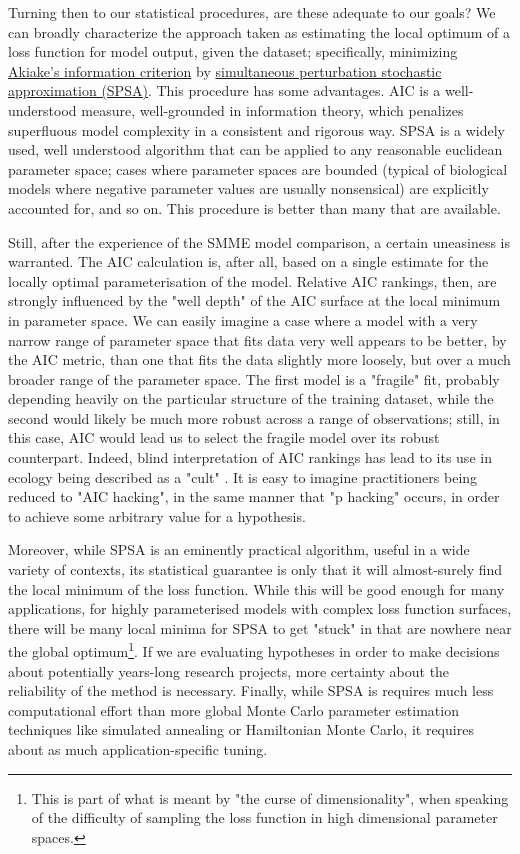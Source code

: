 Turning then to our statistical procedures, are these adequate to our goals? We can broadly characterize the approach taken as estimating the local optimum of a loss function for model output, given the dataset; specifically, minimizing \hyperref[AIC]{Akiake's information criterion} by \hyperref[SPSA]{simultaneous perturbation stochastic approximation (SPSA)}. This procedure has some advantages. AIC is a well-understood measure, well-grounded in information theory, which penalizes superfluous model complexity in a consistent and rigorous way. SPSA is a widely used, well understood algorithm that can be applied to any reasonable euclidean parameter space; cases where parameter spaces are bounded (typical of biological models where negative parameter values are usually nonsensical) are explicitly accounted for, and so on. This procedure is better than many that are available.

Still, after the experience of the SMME model comparison, a certain uneasiness is warranted. The AIC calculation is, after all, based on a single estimate for the locally optimal parameterisation of the model. Relative AIC rankings, then, are strongly influenced by the "well depth" of the AIC surface at the local minimum in parameter space. We can easily imagine a case where a model with a very narrow range of parameter space that fits data very well appears to be better, by the AIC metric, than one that fits the data slightly more loosely, but over a much broader range of the parameter space. The first model is a "fragile" fit, probably depending heavily on the particular structure of the training dataset, while the second would likely be much more robust across a range of observations; still, in this case, AIC would lead us to select the fragile model over its robust counterpart. Indeed, blind interpretation of AIC rankings has lead to its use in ecology being described as a "cult" \cite{Brewer2020}. It is easy to imagine practitioners being reduced to "AIC hacking", in the same manner that "p hacking" occurs, in order to achieve some arbitrary value for a hypothesis.

Moreover, while SPSA is an eminently practical algorithm, useful in a wide variety of contexts, its statistical guarantee is only that it will almost-surely find the local minimum of the loss function. While this will be good enough for many applications, for highly parameterised models with complex loss function surfaces, there will be many local minima for SPSA to get "stuck" in that are nowhere near the global optimum\footnote{This is part of what is meant by "the curse of dimensionality", when speaking of the difficulty of sampling the loss function in high dimensional parameter spaces.}. If we are evaluating hypotheses in order to make decisions about potentially years-long research projects, more certainty about the reliability of the method is necessary. Finally, while SPSA is requires much less computational effort than more global Monte Carlo parameter estimation techniques like simulated annealing or Hamiltonian Monte Carlo, it requires about as much application-specific tuning.

